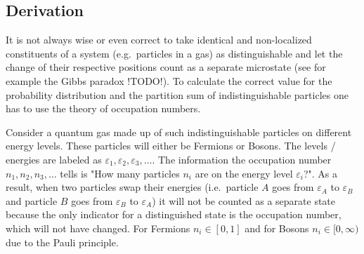 \documentclass[a4paper,10pt]{article}
\numberwithin{equation}{section}
\begin{document}
\begin{multicols}{2}
\subsection{Derivation}
It is not always wise or even correct to take identical and non-localized constituents of a system (e.g.\ particles in a gas) as distinguishable and let the change of their respective positions count as a separate microstate (see for example the Gibbs paradox !TODO!).
To calculate the correct value for the probability distribution and the partition sum of indistinguishable particles one has to use the theory of occupation numbers.

Consider a quantum gas made up of such indistinguishable particles on different energy levels.
These particles will either be Fermions or Bosons.
The levels / energies are labeled as $\varepsilon _1,\varepsilon _2,\varepsilon _3,\hdots $.
The information the occupation number $n_1,n_2,n_3,\hdots $ tells is "How many particles $n_i$ are on the energy level $\varepsilon _i$?".
As a result, when two particles swap their energies (i.e.\ particle $A$ goes from $\varepsilon _A$ to $\varepsilon _B$ and particle $B$ goes from $\varepsilon _B$ to $\varepsilon _A$) it will not be counted as a separate state because the only indicator for a distinguished state is the occupation number, which will not have changed.
For Fermions $n_i  \in \left[0,1\right]$ and for Bosons $n_i  \in [0,\infty)$ due to the Pauli principle.


\end{multicols}
\end{document}
